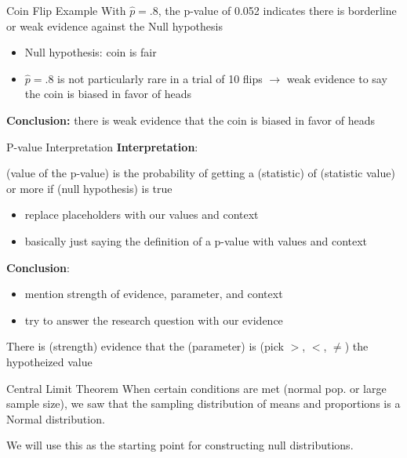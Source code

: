 \documentclass{beamer}
\begin{document}
\begin{frame}{Coin Flip Example}
With $\widehat{p} = .8$, the p-value of 0.052 indicates there is borderline or weak evidence against the Null hypothesis
\begin{itemize}
    \item Null hypothesis: coin is fair
    \item $\widehat{p} = .8$ is not particularly rare in a trial of 10 flips $\rightarrow$ weak evidence to say the coin is biased in favor of heads
\end{itemize} \vspace{12mm}

\textbf{Conclusion:} there is weak evidence that the coin is biased in favor of heads
\end{frame}

\begin{frame}{P-value Interpretation}
\textbf{Interpretation}:

(value of the p-value) is the probability of getting a (statistic) of (statistic value) or more if (null hypothesis) is true
\begin{itemize}
    \item replace placeholders with our values and context
    \item basically just saying the definition of a p-value with values and context
\end{itemize} \vspace{8mm}

\textbf{Conclusion}: 
\begin{itemize}
    \item mention strength of evidence, parameter, and context
    \item try to answer the research question with our evidence
\end{itemize}
There is (strength) evidence that the (parameter) is (pick $>$, $<$, $\neq$) the hypotheized value
\end{frame}


\begin{frame}{Central Limit Theorem}
When certain conditions are met (normal pop. or large sample size), we saw that the sampling distribution of means and proportions is a Normal distribution. \vspace{12mm}

We will use this as the starting point for constructing null distributions.
\end{frame}
\end{document}
